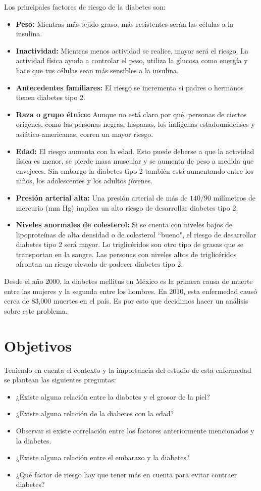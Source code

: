 \documentclass{article}
\begin{document}
Los principales factores de riesgo de la diabetes son:
\begin{itemize}
	\item \textbf{Peso:} Mientras más tejido graso, más resistentes serán las células a la insulina.
	\item \textbf{Inactividad:} Mientras menos actividad se realice, mayor será el riesgo. La actividad física ayuda a controlar el peso, utiliza la glucosa como energía y hace que tus células sean más sensibles a la insulina.
	\item \textbf{Antecedentes familiares:} El riesgo se incrementa si padres o hermanos tienen diabetes tipo 2.
	\item \textbf{Raza o grupo étnico:} Aunque no está claro por qué, personas de ciertos orígenes, como las personas negras, hispanas, los indígenas estadounidenses y asiático-americanas, corren un mayor riesgo.
	\item \textbf{Edad:} El riesgo aumenta con la edad. Esto puede deberse a que la actividad física es menor, se pierde masa muscular y se aumenta de peso a medida que envejeces. Sin embargo la diabetes tipo 2 también está aumentando entre los niños, los adolescentes y los adultos jóvenes.
	\item \textbf{Presión arterial alta:} Una presión arterial de más de $140/90$ milímetros de mercurio (mm Hg) implica un alto riesgo de desarrollar diabetes tipo 2.
	\item \textbf{Niveles anormales de colesterol:} Si se cuenta con niveles bajos de lipoproteínas de alta densidad o de colesterol ``bueno", el riesgo de desarrollar diabetes tipo 2 será mayor. Lo triglicéridos son otro tipo de grasas que se transportan en la sangre. Las personas con niveles altos de triglicéridos afrontan un riesgo elevado de padecer diabetes tipo 2. 
\end{itemize}

Desde el año 2000, la diabetes mellitus en México es la primera causa de muerte entre las mujeres y la segunda entre los hombres. En 2010, esta enfermedad causó cerca de 83,000 muertes en el país. Es por esto que decidimos hacer un análisis sobre este problema.


\section{Objetivos}

Teniendo en cuenta el contexto y la importancia del estudio de esta enfermedad se plantean las siguientes preguntas:
\begin{itemize}
	\item ¿Existe alguna relación entre la diabetes y el grosor de la piel?
	\item ¿Existe alguna relación de la diabetes con la edad?
	\item Observar si existe correlación entre los factores anteriormente mencionados y la diabetes.
	\item ¿Existe alguna relación entre el embarazo y la diabetes?
	\item ¿Qué factor de riesgo hay que tener más en cuenta para evitar contraer diabetes?
\end{itemize}
\end{document}
